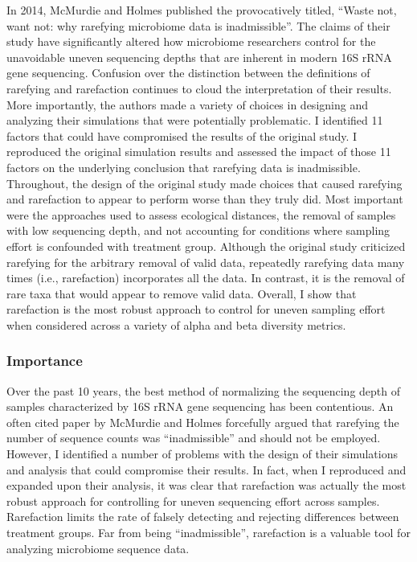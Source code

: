 \documentclass[
]{article}
\begin{document}
In 2014, McMurdie and Holmes published the provocatively titled, ``Waste
not, want not: why rarefying microbiome data is inadmissible''. The
claims of their study have significantly altered how microbiome
researchers control for the unavoidable uneven sequencing depths that
are inherent in modern 16S rRNA gene sequencing. Confusion over the
distinction between the definitions of rarefying and rarefaction
continues to cloud the interpretation of their results. More
importantly, the authors made a variety of choices in designing and
analyzing their simulations that were potentially problematic. I
identified 11 factors that could have compromised the results of the
original study. I reproduced the original simulation results and
assessed the impact of those 11 factors on the underlying conclusion
that rarefying data is inadmissible. Throughout, the design of the
original study made choices that caused rarefying and rarefaction to
appear to perform worse than they truly did. Most important were the
approaches used to assess ecological distances, the removal of samples
with low sequencing depth, and not accounting for conditions where
sampling effort is confounded with treatment group. Although the
original study criticized rarefying for the arbitrary removal of valid
data, repeatedly rarefying data many times (i.e., rarefaction)
incorporates all the data. In contrast, it is the removal of rare taxa
that would appear to remove valid data. Overall, I show that rarefaction
is the most robust approach to control for uneven sampling effort when
considered across a variety of alpha and beta diversity metrics.

\hypertarget{importance}{%
\subsubsection{Importance}\label{importance}}

Over the past 10 years, the best method of normalizing the sequencing
depth of samples characterized by 16S rRNA gene sequencing has been
contentious. An often cited paper by McMurdie and Holmes forcefully
argued that rarefying the number of sequence counts was ``inadmissible''
and should not be employed. However, I identified a number of problems
with the design of their simulations and analysis that could compromise
their results. In fact, when I reproduced and expanded upon their
analysis, it was clear that rarefaction was actually the most robust
approach for controlling for uneven sequencing effort across samples.
Rarefaction limits the rate of falsely detecting and rejecting
differences between treatment groups. Far from being ``inadmissible'',
rarefaction is a valuable tool for analyzing microbiome sequence data.
\end{document}
